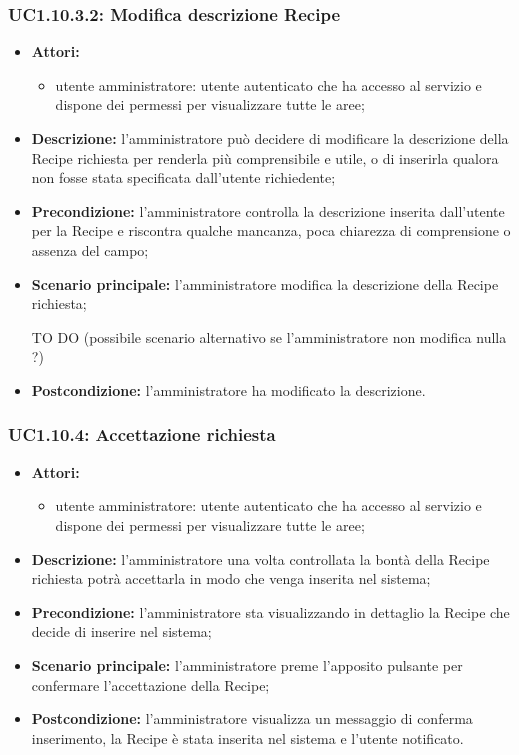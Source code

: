 \subsubsection{UC1.10.3.2: Modifica descrizione Recipe}
	\begin{itemize}
		\item \textbf{Attori:}
		\begin{itemize}
			\item utente amministratore: utente autenticato che ha accesso al servizio e dispone dei permessi per visualizzare tutte le aree;
		\end{itemize}
		\item \textbf{Descrizione:} l'amministratore può decidere di modificare la descrizione della Recipe richiesta per renderla più comprensibile e utile, o di inserirla qualora non fosse stata specificata dall'utente richiedente;
		\item \textbf{Precondizione:} l'amministratore controlla la descrizione inserita dall'utente per la Recipe e riscontra qualche mancanza, poca chiarezza di comprensione o assenza del campo;
		\item \textbf{Scenario principale:} l'amministratore modifica la descrizione della Recipe richiesta;
		\item [TO DO] (possibile scenario alternativo se l'amministratore non modifica nulla ?)
		\item \textbf{Postcondizione:} l'amministratore ha modificato la descrizione.
	\end{itemize}

\subsubsection{UC1.10.4: Accettazione richiesta}
	\begin{itemize}
		\item \textbf{Attori:}
		\begin{itemize}
			\item utente amministratore: utente autenticato che ha accesso al servizio e dispone dei permessi per visualizzare tutte le aree;
		\end{itemize}
		\item \textbf{Descrizione:} l'amministratore una volta controllata la bontà della Recipe richiesta potrà accettarla in modo che venga inserita nel sistema;
		\item \textbf{Precondizione:} l'amministratore sta visualizzando in dettaglio la Recipe che decide di inserire nel sistema;
		\item \textbf{Scenario principale:} l'amministratore preme l'apposito pulsante per confermare l'accettazione della Recipe;
		\item \textbf{Postcondizione:} l'amministratore visualizza un messaggio di conferma inserimento, la Recipe è stata inserita nel sistema e l'utente notificato.
	\end{itemize}

